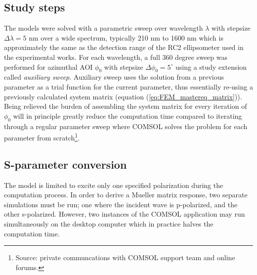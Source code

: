 \subsection{Study steps}
The models were solved with a parametric sweep over wavelength $\lambda$ with stepsize $\Delta\lambda=5$ nm over a wide spectrum, typically 210 nm to 1600 nm which is approximately the same as the detection range of the RC2 ellipsometer used in the experimental works. For each wavelength, a full 360 degree sweep was performed for azimuthal AOI $\phi_0$ with stepsize $\Delta\phi_0=5^{\circ}$ using a study extension called \emph{auxiliary sweep}. Auxiliary sweep uses the solution from a previous parameter as a trial function for the current parameter, thus essentially re-using a previously calculated system matrix (equation (\ref{eq:FEM_mastereq_matrix})). Being relieved the burden of assembling the system matrix for every iteration of $\phi_0$ will in principle greatly reduce the computation time compared to iterating through a regular parameter sweep where COMSOL solves the problem for each parameter from scratch\footnote{Source: private communcations with COMSOL support team and online forums.}. 


\subsection{S-parameter conversion}
 The model is limited to excite only one specified polarization during the computation process. In order to derive a Mueller matrix response, two separate simulations must be run; one where the incident wave is p-polarized, and the other s-polarized. However, two instances of the COMSOL application may run simultaneously on the desktop computer which in practice halves the computation time. 

